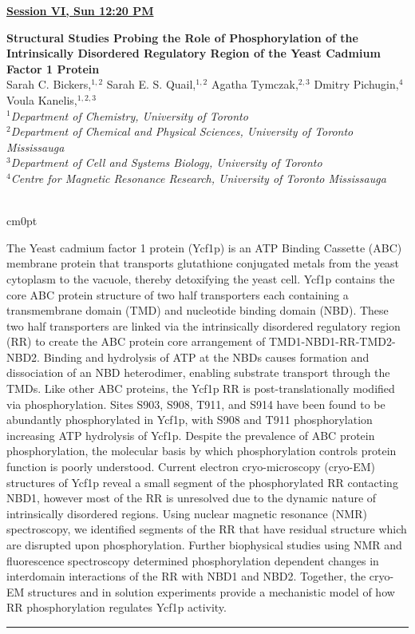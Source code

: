 \documentclass[titlepage,oneside,openany,10pt]{book}
\newenvironment{oralabswfig}[7] %
        {
	\FPeval{\cutw}{clip(16.7-#6)}
	\FPeval{\cutl}{round(#7/0.35,3)}
        \begin{flushright}
                \underline{\textbf{#4}}
        \end{flushright}
        \textbf{#1}\\%
        #2\\%
        \textit{#3}\\\\%
        \def\windowpagestuff{\flushright
                \texttt{[image: \#5]}}
        \opencutright
        \begin{cutout}{0}{\cutw cm}{0pt}{\RoundingUpFunction{\cutl}}
        \noindent
        }
        {
        \end{cutout}
        \noindent\rule{15cm}{0.5pt}%
        }
\begin{document}
\newpage

\begin{oralabswfig}
    {Structural Studies Probing the Role of Phosphorylation of the Intrinsically Disordered Regulatory Region of the Yeast Cadmium Factor 1 Protein}
    {Sarah C. Bickers,$^{1,2}$ Sarah E. S. Quail,$^{1,2}$ Agatha Tymczak,$^{2,3}$ Dmitry Pichugin,$^{4}$ Voula Kanelis,$^{1,2,3}$}
    {
    $^1$Department of Chemistry, University of Toronto\\
    $^2$Department of Chemical and Physical Sciences, University of Toronto Mississauga\\
    $^3$Department of Cell and Systems Biology, University of Toronto\\
    $^4$Centre for Magnetic Resonance Research, University of Toronto Mississauga
    }
    {Session VI, Sun 12:20 PM}
    {abstract_figures/Bickers_Sarah_Oral.jpg}
    {10.0}
    {8.0}
    The Yeast cadmium factor 1 protein (Ycf1p) is an ATP Binding Cassette (ABC) membrane protein that transports glutathione conjugated metals from the yeast cytoplasm to the vacuole, thereby detoxifying the yeast cell. Ycf1p contains the core ABC protein structure of two half transporters each containing a transmembrane domain (TMD) and nucleotide binding domain (NBD). These two half transporters are linked via the intrinsically disordered regulatory region (RR) to create the ABC protein core arrangement of TMD1-NBD1-RR-TMD2-NBD2. Binding and hydrolysis of ATP at the NBDs causes formation and dissociation of an NBD heterodimer, enabling substrate transport through the TMDs. Like other ABC proteins, the Ycf1p RR is post-translationally modified via phosphorylation. Sites S903, S908, T911, and S914 have been found to be abundantly phosphorylated in Ycf1p, with S908 and T911 phosphorylation increasing ATP hydrolysis of Ycf1p. Despite the prevalence of ABC protein phosphorylation, the molecular basis by which phosphorylation controls protein function is poorly understood. Current electron cryo-microscopy (cryo-EM) structures of Ycf1p reveal a small segment of the phosphorylated RR contacting NBD1, however most of the RR is unresolved due to the dynamic nature of intrinsically disordered regions. Using nuclear magnetic resonance (NMR) spectroscopy, we identified segments of the RR that have residual structure which are disrupted upon phosphorylation. Further biophysical studies using NMR and fluorescence spectroscopy determined phosphorylation dependent changes in interdomain interactions of the RR with NBD1 and NBD2. Together, the cryo-EM structures and in solution experiments provide a mechanistic model of how RR phosphorylation regulates Ycf1p activity.
    \label{BickersS}
\end{oralabswfig}
\end{document}

